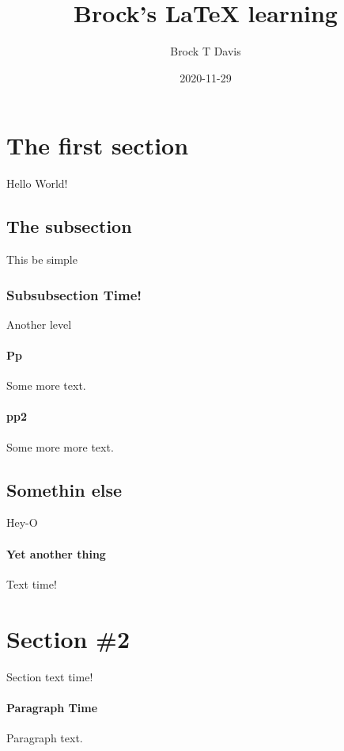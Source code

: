 \documentclass{article}
\title{Brock's LaTeX learning}
\date{2020-11-29}
\author{Brock T Davis}
\begin{document}
  \maketitle
  \newpage


  \section{The first section}
    Hello World!

  \subsection{The subsection}
    This be simple

  \subsubsection{Subsubsection Time!}
    Another level

  \paragraph{Pp}
    Some more text.

  \paragraph{pp2}
    Some more more text.

  \subsection{Somethin else}
    Hey-O

  \paragraph{Yet another thing}
    Text time!

  \section{Section \#2}
    Section text time!

  \paragraph{Paragraph Time}
    Paragraph text.
\end{document}

